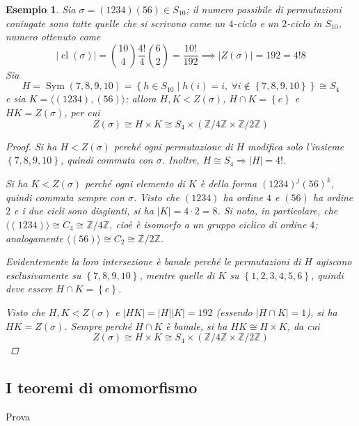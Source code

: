 \documentclass[11pt]{scrartcl}
\theoremstyle{style1}
\newtheorem{esempio}{Esempio}[section]
\numberwithin{equation}{subsection}
\begin{document}
\begin{esempio}
Sia $\sigma = (1234)(56) \in S_{10}$; il numero possibile di permutazioni coniugate sono tutte quelle che si scrivono come un $4$-ciclo e un $2$-ciclo in $S_{10}$, numero ottenuto come
\[
	\lvert \operatorname{cl} (\sigma ) \rvert  = \binom{10}{4}\frac{4!}{4} \binom{6}{2}= \frac{10!}{192}\implies \lvert Z(\sigma ) \rvert = 192 = 4! 8
\] 
Sia
\[
H = \operatorname{Sym} \left(7,8,9,10\right) =\left\{ h \in S_{10}  \mid h(i) = i, \ \forall i \not \in \left\{ 7,8,9,10 \right\}  \right\} \cong S_4
\] 
e sia $K = \langle (1234),(56) \rangle$; allora $H,K < Z(\sigma )$, $H\cap K = \left\{ e \right\} $ e $HK=Z(\sigma )$, per cui
\[
Z(\sigma ) \cong H \times K \cong S_4 \times (\mathbb{Z}/4\mathbb{Z} \times \mathbb{Z}/2\mathbb{Z})
\] 
\begin{proof}
	Si ha $H <Z(\sigma )$ perch\'e ogni permutazione di $H$ modifica solo l'insieme $\left\{ 7,8,9,10 \right\} $, quindi commuta con $\sigma $. Inoltre, $H \cong S_4 \Rightarrow \lvert H \rvert  = 4!$.

	Si ha $K<Z(\sigma )$ perch\'e ogni elemento di $K$ \`e della forma $(1234)^j(56)^k$, quindi commuta sempre con $\sigma $.
	Visto che $(1234)$ ha ordine $4$ e $(56)$ ha ordine $2$ e i due cicli sono disgiunti, si ha $\lvert K \rvert = 4 \cdot 2=8$.
	Si nota, in particolare, che $\langle (1234) \rangle\cong C_4\cong\mathbb{Z}/4\mathbb{Z}$, cio\`e \`e isomorfo a un gruppo ciclico di ordine $4$; analogamente $\langle (56) \rangle\cong C_2\cong\mathbb{Z}/2\mathbb{Z}$.

	Evidentemente la loro intersezione \`e banale perch\'e le permutazioni di $H$ agiscono esclusivamente su $\left\{ 7,8,9,10 \right\} $, mentre quelle di $K$ su $\left\{ 1,2,3,4,5,6 \right\} $, quindi deve essere $H\cap K = \left\{ e \right\} $.

	Visto che $H,K < Z(\sigma )$ e $\lvert HK \rvert = \lvert H \rvert \lvert K \rvert =192 $ (essendo $\lvert H\cap K \rvert = 1$), si ha $HK = Z(\sigma )$.
	Sempre perch\'e $H\cap K$ \`e banale, si ha $HK \cong H \times K$, da cui
	\[
	Z(\sigma ) \cong H \times K \cong S_4 \times (\mathbb{Z}/4\mathbb{Z} \times  \mathbb{Z}/2\mathbb{Z})
	\] 
\end{proof}
\end{esempio}
\subsection{I teoremi di omomorfismo}
Prova
\end{document}
